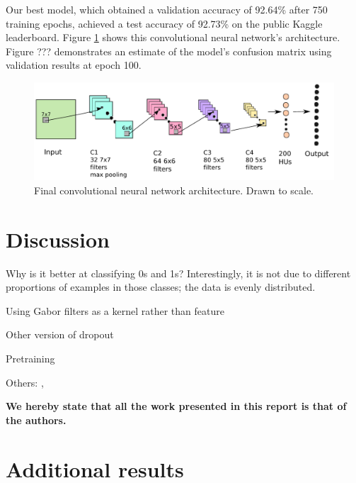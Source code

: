 \documentclass{acm_proc_article-sp}
\begin{document}
Our best model, which obtained a validation accuracy of 92.64\% after 750 training epochs, achieved a test accuracy of 92.73\% on the public Kaggle leaderboard. Figure \ref{fig:convnet-architect} shows this convolutional neural network's architecture. Figure ??? demonstrates an estimate of the model's confusion matrix using validation results at epoch 100.

 \begin{figure}[t]
	\centering
	\includegraphics[width=\linewidth]{architecture.pdf}
  	\caption{Final convolutional neural network architecture. Drawn to scale.}
  	\label{fig:convnet-architect}
\end{figure}



\section{Discussion}%
Why is it better at classifying 0s and 1s? Interestingly, it is not due to different proportions of examples in those classes; the data is evenly distributed.

Using Gabor filters as a kernel rather than feature \cite{Sabri}

Other version of dropout \cite{Wan}

Pretraining \cite{Erhan}

Others: \cite{Rowley}, \cite{Simard}

{\bfseries We hereby state that all the work presented in this report is that of the authors.}




\appendix
\label{appendix}

\section{Additional results}
\label{sec:additional-results}
\end{document}
